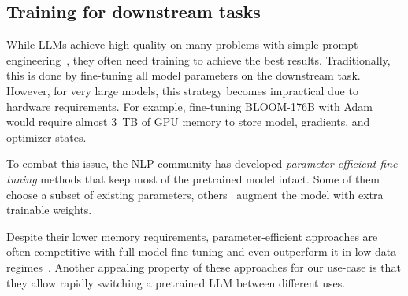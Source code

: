 
\subsection{Training for downstream tasks}\label{sect:design_training}

While LLMs achieve high quality on many problems with simple prompt engineering~\citep{gpt3}, they often need training to achieve the best results. Traditionally, this is done by fine-tuning all model parameters on the downstream task.
However, for very large models, this strategy becomes impractical due to hardware requirements. For example, fine-tuning BLOOM-176B with Adam would require almost 3~TB of GPU memory to store model, gradients, and optimizer states.

To combat this issue, the NLP community has developed \textit{parameter-efficient fine-tuning} methods that keep most of the pretrained model intact. Some of them~\citep{sung2021training,guo2021parameter} choose a subset of existing parameters, others~\citep{hu2021lora, houlsby2019parameter, ptune-liu, ptune-lester, ptune-v2, tfew} augment the model with extra trainable weights.

Despite their lower memory requirements, parameter-efficient approaches are often competitive with full model fine-tuning \citep{hu2021lora,ptune-v2,yong_adapting} and even outperform it in low-data regimes~\citep{2205.05638}. Another appealing property of these approaches for our use-case is that they allow rapidly switching a pretrained LLM between different uses.


